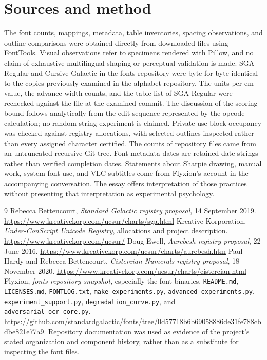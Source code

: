 \documentclass[11pt]{article}
\begin{document}
\section*{Sources and method}

The font counts, mappings, metadata, table inventories, spacing observations, and outline comparisons were obtained directly from downloaded files using FontTools. Visual observations refer to specimens rendered with Pillow, and no claim of exhaustive multilingual shaping or perceptual validation is made. SGA Regular and Cursive Galactic in the fonts repository were byte-for-byte identical to the copies previously examined in the alphabet repository. The units-per-em value, the advance-width counts, and the table list of SGA Regular were rechecked against the file at the examined commit. The discussion of the scoring bound follows analytically from the edit sequence represented by the opcode calculation; no random-string experiment is claimed. Private-use block occupancy was checked against registry allocations, with selected outlines inspected rather than every assigned character certified. The counts of repository files came from an untruncated recursive Git tree. Font metadata dates are retained date strings rather than verified completion dates. Statements about Sharpie drawing, manual work, system-font use, and VLC subtitles come from Flyxion's account in the accompanying conversation. The essay offers interpretation of those practices without presenting that interpretation as experimental psychology.

\begin{thebibliography}{9}
 Rebecca Bettencourt, \emph{Standard Galactic registry proposal}, 14 September 2019. \url{https://www.kreativekorp.com/ucsur/charts/sga.html}
 Kreative Korporation, \emph{Under-ConScript Unicode Registry}, allocations and project description. \url{https://www.kreativekorp.com/ucsur/}
 Doug Ewell, \emph{Aurebesh registry proposal}, 22 June 2016. \url{https://www.kreativekorp.com/ucsur/charts/aurebesh.htm}
 Paul Hardy and Rebecca Bettencourt, \emph{Cistercian Numerals registry proposal}, 18 November 2020. \url{https://www.kreativekorp.com/ucsur/charts/cistercian.html}
 Flyxion, \emph{fonts repository snapshot}, especially the font binaries, \texttt{README.md}, \texttt{LICENSES.md}, \texttt{FONTLOG.txt}, \texttt{make\_experiments.py}, \texttt{advanced\_experiments.py}, \texttt{experiment\_support.py}, \texttt{degradation\_curve.py}, and \texttt{adversarial\_ocr\_core.py}. \url{https://github.com/standardgalactic/fonts/tree/0d57718b6b69058886de31fe788cbdbe821e77a9}. Repository documentation was used as evidence of the project's stated organization and component history, rather than as a substitute for inspecting the font files.
\end{thebibliography}
\end{document}
